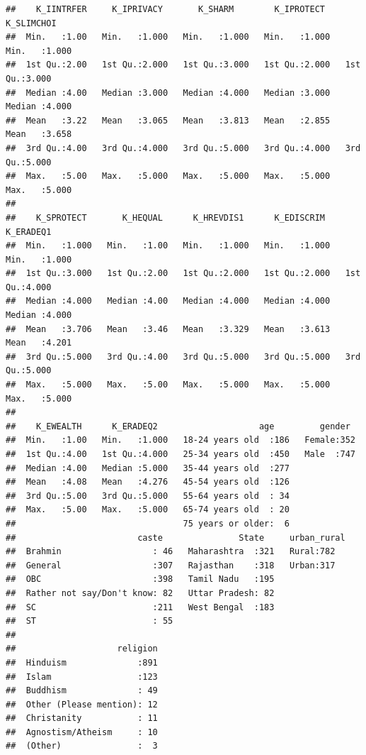 \documentclass[
]{article}
\begin{document}
\begin{verbatim}
##    K_IINTRFER     K_IPRIVACY       K_SHARM        K_IPROTECT      K_SLIMCHOI   
##  Min.   :1.00   Min.   :1.000   Min.   :1.000   Min.   :1.000   Min.   :1.000  
##  1st Qu.:2.00   1st Qu.:2.000   1st Qu.:3.000   1st Qu.:2.000   1st Qu.:3.000  
##  Median :4.00   Median :3.000   Median :4.000   Median :3.000   Median :4.000  
##  Mean   :3.22   Mean   :3.065   Mean   :3.813   Mean   :2.855   Mean   :3.658  
##  3rd Qu.:4.00   3rd Qu.:4.000   3rd Qu.:5.000   3rd Qu.:4.000   3rd Qu.:5.000  
##  Max.   :5.00   Max.   :5.000   Max.   :5.000   Max.   :5.000   Max.   :5.000  
##                                                                                
##    K_SPROTECT       K_HEQUAL      K_HREVDIS1      K_EDISCRIM      K_ERADEQ1    
##  Min.   :1.000   Min.   :1.00   Min.   :1.000   Min.   :1.000   Min.   :1.000  
##  1st Qu.:3.000   1st Qu.:2.00   1st Qu.:2.000   1st Qu.:2.000   1st Qu.:4.000  
##  Median :4.000   Median :4.00   Median :4.000   Median :4.000   Median :4.000  
##  Mean   :3.706   Mean   :3.46   Mean   :3.329   Mean   :3.613   Mean   :4.201  
##  3rd Qu.:5.000   3rd Qu.:4.00   3rd Qu.:5.000   3rd Qu.:5.000   3rd Qu.:5.000  
##  Max.   :5.000   Max.   :5.00   Max.   :5.000   Max.   :5.000   Max.   :5.000  
##                                                                                
##    K_EWEALTH      K_ERADEQ2                    age         gender   
##  Min.   :1.00   Min.   :1.000   18-24 years old  :186   Female:352  
##  1st Qu.:4.00   1st Qu.:4.000   25-34 years old  :450   Male  :747  
##  Median :4.00   Median :5.000   35-44 years old  :277               
##  Mean   :4.08   Mean   :4.276   45-54 years old  :126               
##  3rd Qu.:5.00   3rd Qu.:5.000   55-64 years old  : 34               
##  Max.   :5.00   Max.   :5.000   65-74 years old  : 20               
##                                 75 years or older:  6               
##                        caste               State     urban_rural
##  Brahmin                  : 46   Maharashtra  :321   Rural:782  
##  General                  :307   Rajasthan    :318   Urban:317  
##  OBC                      :398   Tamil Nadu   :195              
##  Rather not say/Don't know: 82   Uttar Pradesh: 82              
##  SC                       :211   West Bengal  :183              
##  ST                       : 55                                  
##                                                                 
##                    religion  
##  Hinduism              :891  
##  Islam                 :123  
##  Buddhism              : 49  
##  Other (Please mention): 12  
##  Christanity           : 11  
##  Agnostism/Atheism     : 10  
##  (Other)               :  3
\end{verbatim}
\end{document}
